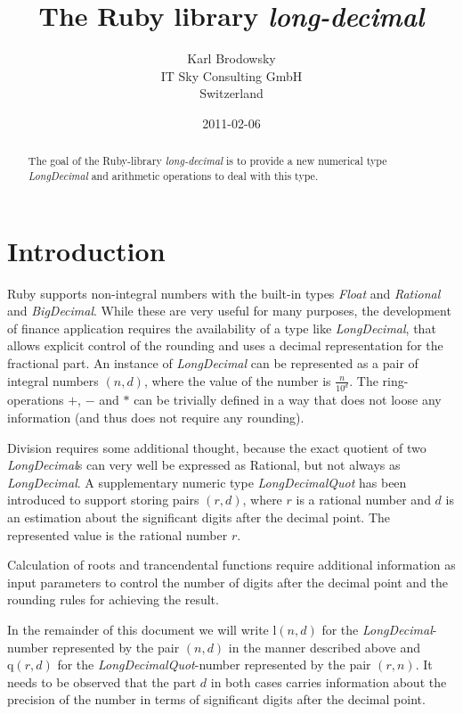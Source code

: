 \documentclass[10pt,a4paper]{article}
\title{The Ruby library {\slshape long-decimal}}
\author{Karl Brodowsky\\
IT Sky Consulting GmbH\\
Switzerland}
\date{2011-02-06}
\def\ld{\mathrm l}
\def\ldq{\mathrm q}
\begin{document}
\sffamily
\maketitle

\begin{abstract}

The goal of the Ruby-library {\slshape long-decimal}\/ is to provide a new
numerical type {\slshape LongDecimal\/}\/ and arithmetic operations to deal
with this type.

\end{abstract}

\section{Introduction}

Ruby supports non-integral numbers with the built-in types {\slshape
  Float\/} and {\slshape Rational\/} and {\slshape BigDecimal\/}.
While these are very useful for many purposes, the development of
finance application requires the availability of a type like
{\slshape LongDecimal\/}, that allows explicit control of the rounding and uses a
decimal representation for the fractional part.  An instance of
{\slshape LongDecimal\/} can be represented as a pair of integral
numbers $(n, d)$, where the value of the number is $\frac{n}{10^d}$.
The ring-operations $+$, $-$ and $*$ can be trivially defined in a way
that does not loose any information (and thus does not require any
rounding).

Division requires some additional thought, because the exact quotient
of two {\slshape LongDecimal\/}s can very well be expressed as
Rational, but not always as {\slshape LongDecimal\/}.  A supplementary
numeric type {\slshape LongDecimalQuot\/} has been introduced to
support storing pairs $(r, d)$, where $r$ is a rational number and $d$
is an estimation about the significant digits after the decimal point.
The represented value is the rational number $r$.

Calculation of roots and trancendental functions require additional
information as input parameters to control the number of digits after
the decimal point and the rounding rules for achieving the result.

In the remainder of this document we will write $\ld(n, d)$ for the
{\slshape LongDecimal\/}-number represented by the pair $(n, d)$ in
the manner described above and $\ldq(r, d)$ for the {\slshape
  LongDecimalQuot\/}-number represented by the pair $(r, n)$.  It
needs to be observed that the part $d$ in both cases carries
information about the precision of the number in terms of significant
digits after the decimal point.
\end{document}
